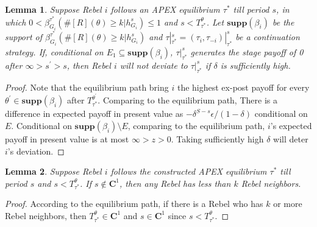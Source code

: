 \documentclass[12pt,letter]{article}
\newcommand{\Kappa}{\mathbf{C}}
\newtheorem{lemma}{Lemma}[section]
\theoremstyle{definition}
\theoremstyle{remark}
\theoremstyle{claim}
\begin{document}
\begin{lemma}
Suppose Rebel $i$ follows an APEX equilibrium $\tau^{*}$ till period $s$, in which $0<\beta^{\tau^{*}}_{G_i}(\#[R](\theta)\geq k|h^s_{G_i})\leq 1$ and $s<T^{\theta}_{\tau^{*}}$. Let $\mathbf{supp}(\beta_i)$ be the support of $\beta^{\tau^{*}}_{G_i}(\#[R](\theta)\geq k|h^s_{G_i})$ and $\tau|^s_{\tau^{*}}=(\tau_i,\tau_{-i})|^s_{\tau^{*}}$ be a continuation strategy. If, conditional on $E_1\subseteq \mathbf{supp}(\beta_i)$, $\tau|^s_{\tau^{*}}$ generates the stage payoff of 0 after $\infty> s^{'}>s$, then Rebel $i$ will not deviate to $\tau|^s_{\tau^{*}}$ if $\delta$ is sufficiently high. 
\end{lemma}
\begin{proof}
Note that the equilibrium path bring $i$ the highest ex-post payoff for every $\theta^{'}\in \mathbf{supp}(\beta_i)$ after $T^{\theta^{'}}_{\tau^{*}}$. Comparing to the equilibrium path, There is a difference in expected payoff in present value as $-\delta^{S-s}\epsilon/(1-\delta)$ conditional on $E$. Conditional on $\mathbf{supp}(\beta_i)\setminus E$, comparing to the equilibrium path, $i$'s expected payoff in present value is at most $\infty>z>0$. Taking sufficiently high $\delta$ will deter $i$'s deviation.
\end{proof}


\begin{lemma}\label{lemma:less_than_k} Suppose Rebel $i$ follows the constructed APEX equilibrium $\tau^{*}$ till period $s$ and $s<T^{\theta}_{\tau^{*}}$. If $s\not\in \Kappa^1$, then any Rebel has less than $k$ Rebel neighbors.
\end{lemma}
\begin{proof}
According to the equilibrium path, if there is a Rebel who has $k$ or more Rebel neighbors, then $T^{\theta}_{\tau^{*}}\in \Kappa^1$ and $s\in \Kappa^1$ since $s<T^{\theta}_{\tau^{*}}$.
\end{proof}
\end{document}

